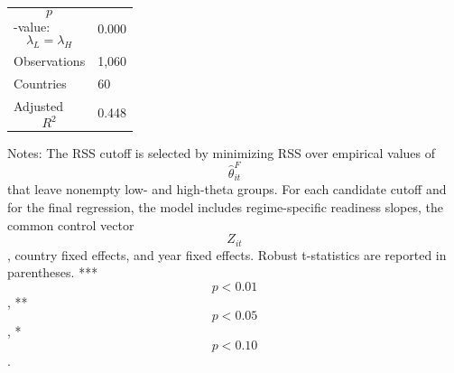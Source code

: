 \begin{table}[H]
\begin{threeparttable}
\begin{tabularx}{\textwidth}{lY}
$$p$$-value: $$\lambda_L=\lambda_H$$ & 0.000 \\
Observations & 1,060 \\
Countries & 60 \\
Adjusted $$R^2$$ & 0.448 \\
\bottomrule
\end{tabularx}
\begin{tablenotes}[flushleft]\footnotesize
\item Notes: The RSS cutoff is selected by minimizing RSS over empirical values of $$\widehat{\theta}^{F}_{it}$$ that leave nonempty low- and high-theta groups. For each candidate cutoff and for the final regression, the model includes regime-specific readiness slopes, the common control vector $$Z_{it}$$, country fixed effects, and year fixed effects. Robust t-statistics are reported in parentheses. *** $$p<0.01$$, ** $$p<0.05$$, * $$p<0.10$$.
\end{tablenotes}
\end{threeparttable}
\end{table}
